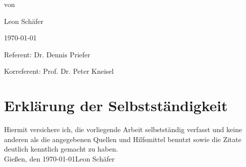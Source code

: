 \begin{titlepage}
\begin{center}
von
\par\end{center}

\begin{center}
Leon Schäfer
\par\end{center}

\begin{center}
\today
\par\end{center}

\vspace{1.5cm}


Referent: Dr. Dennis Priefer

Korreferent: Prof. Dr. Peter Kneisel

\end{titlepage}


\thispagestyle{empty}
\chapter*{Erklärung der Selbstständigkeit}
\thispagestyle{empty}
Hiermit versichere ich, die vorliegende Arbeit selbstständig verfasst und keine anderen als die angegebenen Quellen und Hilfsmittel benutzt sowie die Zitate deutlich kenntlich gemacht zu haben.
\vspace{4\baselineskip}\\
Gießen, den \today \hfill Leon Schäfer
\vspace{4\baselineskip}\\
\clearpage
\mbox{}\thispagestyle{empty}

